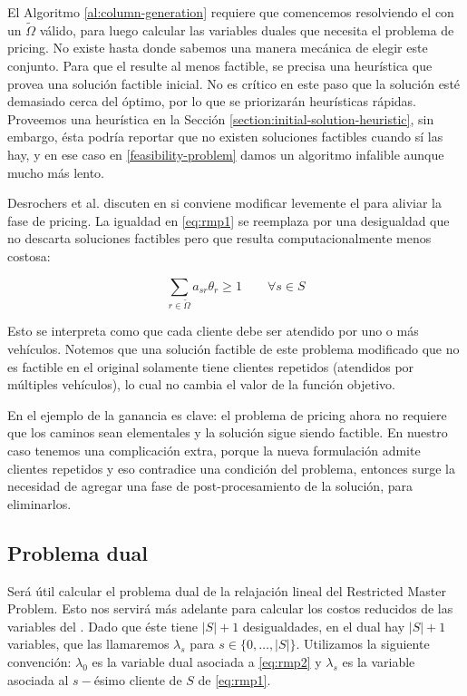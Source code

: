 El Algoritmo \ref{al:column-generation} requiere que comencemos resolviendo el  con un $\tilde{\Omega}$ válido, para luego calcular las variables duales que necesita el problema de pricing. No existe hasta donde sabemos una manera mecánica de elegir este conjunto. Para que el  resulte al menos factible, se precisa una heurística que provea una solución factible inicial. No es crítico en este paso que la solución esté demasiado cerca del óptimo, por lo que se priorizarán heurísticas rápidas. Proveemos una heurística en la Sección \ref{section:initial-solution-heuristic}, sin embargo, ésta podría reportar que no existen soluciones factibles cuando sí las hay, y en ese caso en \ref{feasibility-problem} damos un algoritmo infalible aunque mucho más lento.

Desrochers et al. discuten en \cite{desrochers1992} si conviene modificar levemente el  para aliviar la fase de pricing. La igualdad en \ref{eq:rmp1} se reemplaza por una desigualdad que no descarta soluciones factibles pero que resulta computacionalmente menos costosa:

\begin{equation}
\label{eq:ge-restriction-rmp}
     \sum_{r \in \tilde{\Omega}} {a_{sr}\theta_r} \geq 1
\qquad \forall {s \in S}
\end{equation}

Esto se interpreta como que cada cliente debe ser atendido por uno o más vehículos. Notemos que una solución factible de este problema modificado que no es factible en el original solamente tiene clientes repetidos (atendidos por múltiples vehículos), lo cual no cambia el valor de la función objetivo.

En el ejemplo de \cite{desrochers1992} la ganancia es clave: el problema de pricing ahora no requiere que los caminos sean elementales y la solución sigue siendo factible. En nuestro caso tenemos una complicación extra, porque la nueva formulación admite clientes repetidos y eso contradice una condición del problema, entonces surge la necesidad de agregar una fase de post-procesamiento de la solución, para eliminarlos.


\subsection{Problema dual}

Será útil calcular el problema dual de la relajación lineal del Restricted Master Problem. Esto nos servirá más adelante para calcular los costos reducidos de las variables del . 
Dado que éste tiene $|S| + 1$ desigualdades, en el dual hay $|S| + 1$ variables, que las llamaremos $\lambda_s$ para $s \in \{0, \dots, |S|\}$. Utilizamos la siguiente convención: $\lambda_0$ es la variable dual asociada a \ref{eq:rmp2} y $\lambda_{s}$ es la variable asociada al $s-$ésimo cliente de $S$ de \ref{eq:rmp1}.
\\

